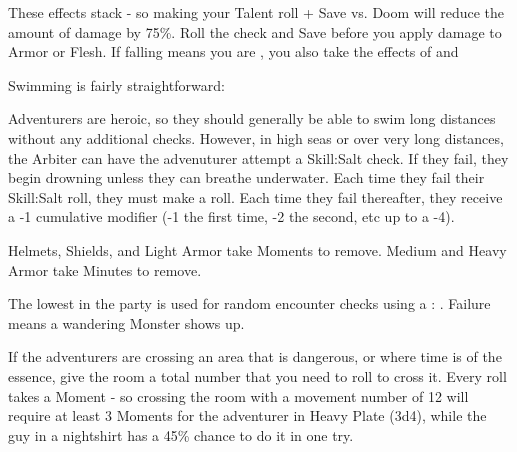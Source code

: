 {  These effects stack - so making your Talent roll + Save vs. Doom will reduce the amount of damage by 75\%.  Roll the check and Save before you apply damage to Armor or Flesh.  If falling means you are , you also take the effects of  and 




Swimming is fairly straightforward:


Adventurers are heroic, so they should generally be able to swim long distances without any additional checks.  However, in high seas or over very long distances, the Arbiter can have the advenuturer attempt a Skill:Salt check.  If they fail, they begin drowning unless they can breathe underwater.  Each time they fail their Skill:Salt roll, they must make a \DEATH roll.  Each time they fail thereafter, they receive a -1 cumulative modifier (-1 the first time, -2 the second, etc up to a -4).  


  Helmets, Shields, and Light Armor take Moments to remove.  Medium and Heavy Armor take Minutes to remove.

\cbreak


  The lowest \MD in the party is used for random encounter checks using a \RS : \MD.  Failure means a wandering Monster shows up. 


  If the adventurers are crossing an area that is dangerous, or where time is of the essence, give the room a total number that you need to roll to cross it.  Every \MD roll takes a Moment - so crossing the room with a movement number of 12 will require at least 3 Moments for the adventurer in Heavy Plate (3d4), while the guy in a nightshirt has a 45\% chance to do it in one try.


}
